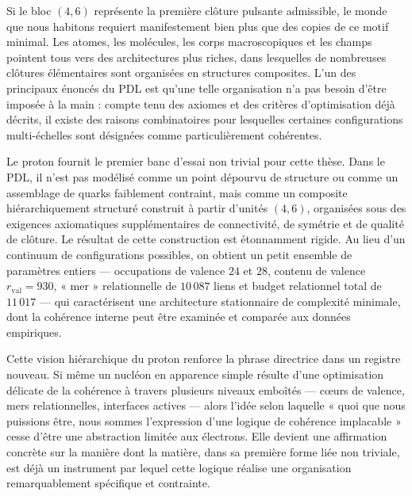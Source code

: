 \documentclass[11pt,a4paper]{article}
\theoremstyle{definition}
\begin{document}
Si le bloc \((4,6)\) représente la première clôture pulsante admissible, le monde que nous habitons requiert manifestement bien plus que des copies de ce motif minimal. Les atomes, les molécules, les corps macroscopiques et les champs pointent tous vers des architectures plus riches, dans lesquelles de nombreuses clôtures élémentaires sont organisées en structures composites. L’un des principaux énoncés du PDL est qu’une telle organisation n’a pas besoin d’être imposée à la main : compte tenu des axiomes et des critères d’optimisation déjà décrits, il existe des raisons combinatoires pour lesquelles certaines configurations multi-échelles sont désignées comme particulièrement cohérentes.\cite{Laubscher_EmergencePhysicalReality_2024,Laubscher_PDL_GlobalMapping_v6_2024}

Le proton fournit le premier banc d’essai non trivial pour cette thèse. Dans le PDL, il n’est pas modélisé comme un point dépourvu de structure ou comme un assemblage de quarks faiblement contraint, mais comme un composite hiérarchiquement structuré construit à partir d’unités \((4,6)\), organisées sous des exigences axiomatiques supplémentaires de connectivité, de symétrie et de qualité de clôture.\cite{Laubscher_ProtonArch_v1_2024,Laubscher_ProtonArch_v2_2024} Le résultat de cette construction est étonnamment rigide. Au lieu d’un continuum de configurations possibles, on obtient un petit ensemble de paramètres entiers — occupations de valence \(24\) et \(28\), contenu de valence \(r_{\mathrm{val}} = 930\), « mer » relationnelle de \(10\,087\) liens et budget relationnel total de \(11\,017\) — qui caractérisent une architecture stationnaire de complexité minimale, dont la cohérence interne peut être examinée et comparée aux données empiriques.\cite{Laubscher_ProtonArch_v2_2024,Laubscher_PDL_GlobalMapping_v6_2024}

Cette vision hiérarchique du proton renforce la phrase directrice dans un registre nouveau. Si même un nucléon en apparence simple résulte d’une optimisation délicate de la cohérence à travers plusieurs niveaux emboîtés — cœurs de valence, mers relationnelles, interfaces actives — alors l’idée selon laquelle « quoi que nous puissions être, nous sommes l’expression d’une logique de cohérence implacable » cesse d’être une abstraction limitée aux électrons. Elle devient une affirmation concrète sur la manière dont la matière, dans sa première forme liée non triviale, est déjà un instrument par lequel cette logique réalise une organisation remarquablement spécifique et contrainte.\cite{Laubscher_Existence_PulsatingClosure_2026}
\end{document}
